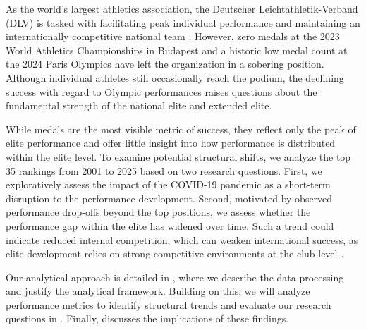 As the world’s largest athletics association, the Deutscher Leichtathletik-Verband (DLV) is tasked with facilitating peak individual performance and maintaining an internationally 
competitive national team \citep{DLV2026}. However, zero medals at the 2023 World Athletics Championships in Budapest and a historic low medal count at the 2024 Paris Olympics have left 
the organization in a sobering position. Although individual athletes still occasionally reach the podium, the declining success with regard to Olympic performances \citep{fremerey2024} raises questions about the fundamental strength of the national elite and extended elite.

While medals are the most visible metric of success, they reflect only the peak of elite performance and offer little insight into how performance is distributed within the elite level. 
To examine potential structural shifts, we analyze the top 35 rankings from 2001 to 2025 based on two research questions. First, we exploratively assess the impact of the COVID-19 pandemic as a short-term disruption to the performance development. Second, motivated by observed performance drop-offs beyond the top positions, we assess whether the performance gap 
within the elite has widened over time. Such a trend could indicate reduced internal competition, which can weaken international success, as elite development relies on strong 
competitive environments at the club level \citep[Tihanyi, 2001, cited in][]{Green2005}.

Our analytical approach is detailed in , where we describe the data processing and justify the analytical framework. Building on this, we will analyze performance 
metrics to identify structural trends and evaluate our research questions in . Finally,  discusses the implications of these findings.